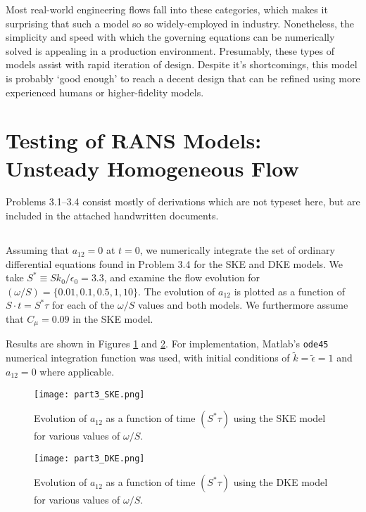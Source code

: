 \documentclass[11pt]{article}
\begin{document}
Most real-world engineering flows fall into these categories, which makes it surprising that such a model so so widely-employed in industry. Nonetheless, the simplicity and speed with which the governing equations can be numerically solved is appealing in a production environment. Presumably, these types of models assist with rapid iteration of design. Despite it's shortcomings, this model is probably `good enough' to reach a decent design that can be refined using more experienced humans or higher-fidelity models.

\section{Testing of RANS Models: Unsteady Homogeneous Flow}

Problems 3.1--3.4 consist mostly of derivations which are not typeset here, but are included in the attached handwritten documents.
\setcounter{subsection}{4}

\subsection{}

Assuming that $a_{12}=0$ at $t=0$, we numerically integrate the set of ordinary differential equations found in Problem 3.4 for the SKE and DKE models. We take $S^* \equiv S k_0 / \epsilon_0 = 3.3$, and examine the flow evolution for $(\omega/S) = \{0.01,0.1,0.5,1,10\}$. The evolution of $a_{12}$ is plotted as a function of $S \cdot t = S^* \tau$ for each of the $\omega/S$ values and both models. We furthermore assume that $C_\mu = 0.09$ in the SKE model.

Results are shown in Figures \ref{fig:part3_SKE} and \ref{fig:part3_DKE}. For implementation, Matlab's \lstinline|ode45| numerical integration function was used, with initial conditions of $\tilde{k}=\tilde{\epsilon}=1$ and $a_{12}=0$ where applicable.

\begin{figure}[p]
\centering
\texttt{[image: part3\_SKE.png]}
\vspace{6pt}
\caption{Evolution of $a_{12}$ as a function of time $(S^* \tau)$ using the SKE model for various values of $\omega/S$.}
\label{fig:part3_SKE}
\end{figure}

\begin{figure}[p]
\centering
\texttt{[image: part3\_DKE.png]}
\vspace{6pt}
\caption{Evolution of $a_{12}$ as a function of time $(S^* \tau)$ using the DKE model for various values of $\omega/S$.}
\label{fig:part3_DKE}
\end{figure}
\end{document}
